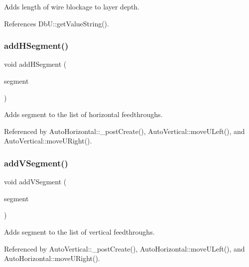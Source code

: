 Adds {\ttfamily length} of wire blockage to layer {\ttfamily depth}. 

References Db\+U\+::get\+Value\+String().

\mbox{\label{classKatabatic_1_1GCell_a4aad7d6f7357fd7963aab91bc2019a1b}} 
\subsubsection{\texorpdfstring{add\+H\+Segment()}{addHSegment()}}
{\footnotesize\ttfamily void add\+H\+Segment (\begin{DoxyParamCaption}\item[{\mbox{\hyperlink{classKatabatic_1_1AutoSegment}{Auto\+Segment}} $\ast$}]{segment }\end{DoxyParamCaption})\hspace{0.3cm}{\ttfamily [inline]}}

Adds {\ttfamily segment} to the list of horizontal feedthroughs. 

Referenced by Auto\+Horizontal\+::\+\_\+post\+Create(), Auto\+Vertical\+::move\+U\+Left(), and Auto\+Vertical\+::move\+U\+Right().

\mbox{\label{classKatabatic_1_1GCell_a8aa815e9e99df8187e628f6ec9e9da77}} 
\subsubsection{\texorpdfstring{add\+V\+Segment()}{addVSegment()}}
{\footnotesize\ttfamily void add\+V\+Segment (\begin{DoxyParamCaption}\item[{\mbox{\hyperlink{classKatabatic_1_1AutoSegment}{Auto\+Segment}} $\ast$}]{segment }\end{DoxyParamCaption})\hspace{0.3cm}{\ttfamily [inline]}}

Adds {\ttfamily segment} to the list of vertical feedthroughs. 

Referenced by Auto\+Vertical\+::\+\_\+post\+Create(), Auto\+Horizontal\+::move\+U\+Left(), and Auto\+Horizontal\+::move\+U\+Right().

